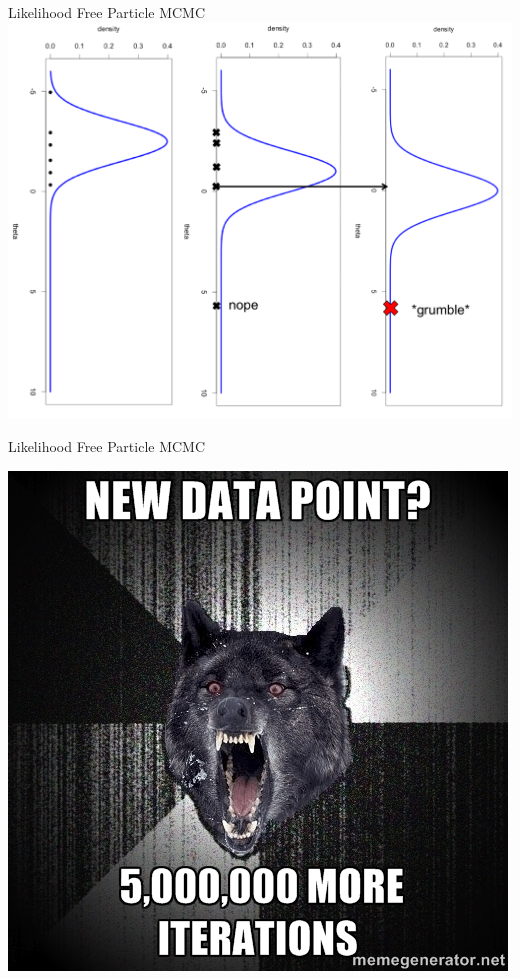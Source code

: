\documentclass[12pt,a4paper,t,xcolor=dvipsnames,slidestop,compress,mathserif]{beamer}
\begin{document}
\begin{frame}{Likelihood Free Particle MCMC}
\includegraphics[scale=0.35]{post_sample6_graphic.png}
\end{frame}
\begin{frame}{Likelihood Free Particle MCMC}
\begin{center}
\includegraphics[scale=0.55]{insanity_wolf.jpg}
\end{center}
\end{frame}
\end{document}

